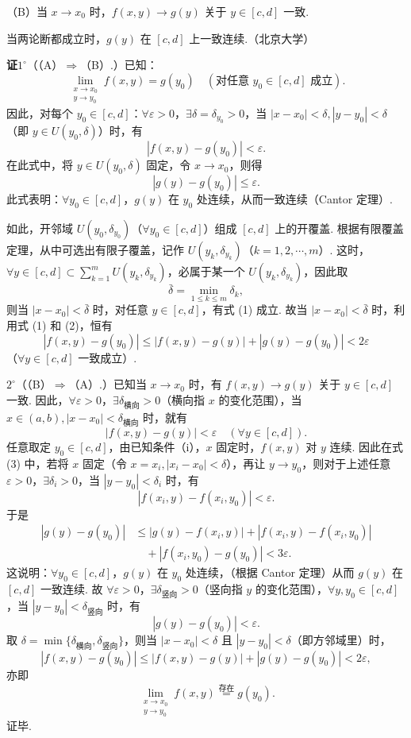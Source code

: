 \documentclass[UTF8,12pt,a4paper,fontset=fandol]{ctexart}
\begin{document}
（B）当 $x\to x_0$ 时，$f(x,y)\to g(y)$ 关于 $y\in[c,d]$ 一致.

当两论断都成立时，$g(y)$ 在 $[c,d]$ 上一致连续.（北京大学）

\noindent\textbf{证}\quad $1^\circ$（（A）$\Rightarrow$（B）.）已知：
\[
  \lim_{\substack{x\to x_0\\ y\to y_0}}f(x,y)=g(y_0)
  \quad(\text{对任意 }y_0\in[c,d]\text{ 成立}).
\]
因此，对每个 $y_0\in[c,d]$：$\forall\varepsilon>0$，$\exists\delta=\delta_{y_0}>0$，当 $|x-x_0|<\delta,|y-y_0|<\delta$（即 $y\in U(y_0,\delta)$）时，有
\[
  |f(x,y)-g(y_0)|<\varepsilon. \tag{1}
\]
在此式中，将 $y\in U(y_0,\delta)$ 固定，令 $x\to x_0$，则得
\[
  |g(y)-g(y_0)|\le\varepsilon. \tag{2}
\]
此式表明：$\forall y_0\in[c,d]$，$g(y)$ 在 $y_0$ 处连续，从而一致连续（Cantor 定理）.

如此，开邻域 $U(y_0,\delta_{y_0})$（$\forall y_0\in[c,d]$）组成 $[c,d]$ 上的开覆盖. 根据有限覆盖定理，从中可选出有限子覆盖，记作 $U(y_k,\delta_{y_k})$（$k=1,2,\cdots,m$）. 这时，$\forall y\in[c,d]\subset\displaystyle\sum_{k=1}^m U(y_k,\delta_{y_k})$，必属于某一个 $U(y_k,\delta_{y_k})$，因此取
\[
  \bar\delta=\min_{1\le k\le m}\delta_k,
\]
则当 $|x-x_0|<\bar\delta$ 时，对任意 $y\in[c,d]$，有式 (1) 成立. 故当 $|x-x_0|<\bar\delta$ 时，利用式 (1) 和 (2)，恒有
\[
  |f(x,y)-g(y_0)|\le |f(x,y)-g(y)|+|g(y)-g(y_0)|<2\varepsilon
\]
（$\forall y\in[c,d]$ 一致成立）.

$2^\circ$（（B）$\Rightarrow$（A）.）已知当 $x\to x_0$ 时，有 $f(x,y)\to g(y)$ 关于 $y\in[c,d]$ 一致. 因此，$\forall\varepsilon>0$，$\exists\delta_{\text{横向}}>0$（横向指 $x$ 的变化范围），当 $x\in(a,b),|x-x_0|<\delta_{\text{横向}}$ 时，就有
\[
  |f(x,y)-g(y)|<\varepsilon\quad(\forall y\in[c,d]). \tag{3}
\]
任意取定 $y_0\in[c,d]$，由已知条件（i），$x$ 固定时，$f(x,y)$ 对 $y$ 连续. 因此在式 (3) 中，若将 $x$ 固定（令 $x=x_i,|x_i-x_0|<\delta$），再让 $y\to y_0$，则对于上述任意 $\varepsilon>0$，$\exists\delta_i>0$，当 $|y-y_0|<\delta_i$ 时，有
\[
  |f(x_i,y)-f(x_i,y_0)|<\varepsilon.
\]
于是
\[
\begin{aligned}
|g(y)-g(y_0)|
&\le |g(y)-f(x_i,y)|+|f(x_i,y)-f(x_i,y_0)|\\
&\quad+|f(x_i,y_0)-g(y_0)|<3\varepsilon.
\end{aligned}
\]
这说明：$\forall y_0\in[c,d]$，$g(y)$ 在 $y_0$ 处连续，（根据 Cantor 定理）从而 $g(y)$ 在 $[c,d]$ 一致连续. 故 $\forall\varepsilon>0$，$\exists\delta_{\text{竖向}}>0$（竖向指 $y$ 的变化范围），$\forall y,y_0\in[c,d]$，当 $|y-y_0|<\delta_{\text{竖向}}$ 时，有
\[
  |g(y)-g(y_0)|<\varepsilon. \tag{4}
\]
取 $\delta=\min\{\delta_{\text{横向}},\delta_{\text{竖向}}\}$，则当 $|x-x_0|<\delta$ 且 $|y-y_0|<\delta$（即方邻域里）时，
\[
  |f(x,y)-g(y_0)|\le |f(x,y)-g(y)|+|g(y)-g(y_0)|<2\varepsilon,
\]
亦即
\[
  \lim_{\substack{x\to x_0\\ y\to y_0}}f(x,y)\stackrel{\text{存在}}{=}g(y_0).
\]
证毕.
\end{document}
